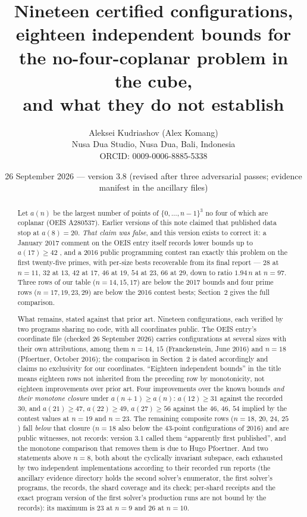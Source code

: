 \documentclass[11pt,a4paper]{article}
\title{Nineteen certified configurations, eighteen independent bounds for the no-four-coplanar problem in the cube,\\
and what they do not establish}
\author{Aleksei Kudriashov (Alex Komang)\\ \small Nusa Dua Studio, Nusa Dua, Bali, Indonesia\\ \small ORCID: 0009-0006-8885-5338}
\date{26 September 2026 --- version 3.8 (revised after three adversarial passes; evidence manifest in the ancillary files)}
\begin{document}
\maketitle
\begin{abstract}
Let $a(n)$ be the largest number of points of $\{0,\dots,n-1\}^3$ no four of which are coplanar
(OEIS A280537).  Earlier versions of this note claimed that published data stop at $a(8)=20$.
\emph{That claim was false}, and this version exists to correct it: a January 2017 comment on
the OEIS entry itself records lower bounds up to $a(17)\ge42$ \cite{OEISA280537}, and a 2016
public programming contest ran exactly this problem on the first twenty-five primes, with
per-size bests recoverable from its final report \cite{AZsPCs} --- $28$ at $n=11$, $32$ at $13$,
$42$ at $17$, $46$ at $19$, $54$ at $23$, $66$ at $29$, down to ratio $1.94\,n$ at $n=97$.
Three rows of our table ($n=14,15,17$) are below the 2017 bounds and four prime rows
($n=17,19,23,29$) are below the 2016 contest bests; Section~2 gives the full comparison.

What remains, stated against that prior art.  Nineteen configurations, each verified by two
programs sharing no code, with all coordinates public.  The OEIS entry's coordinate file (checked
26 September 2026) carries configurations at several sizes with their own attributions, among them
$n=14$, $15$ (Franckenstein, June 2016) and $n=18$ (Pfoertner, October 2016); the comparison in
Section~2 is dated accordingly and claims no exclusivity for our coordinates.  ``Eighteen independent bounds'' in the title means eighteen rows not inherited from
the preceding row by monotonicity, not eighteen improvements over prior art.  Four improvements over the known bounds \emph{and their monotone
closure} under $a(n+1)\ge a(n)$: $a(12)\ge31$ against the recorded $30$, and $a(21)\ge47$,
$a(22)\ge49$, $a(27)\ge56$ against the $46$, $46$, $54$ implied by the contest values at $n=19$
and $n=23$.  The remaining composite rows ($n=18$, $20$, $24$, $25$) fall \emph{below} that
closure ($n=18$ also below the $43$-point configurations of 2016) and are public witnesses, not records: version 3.1 called them ``apparently first
published'', and the monotone comparison that removes them is due to Hugo Pfoertner.  And two
statements above $n=8$, both about the cyclically invariant subspace, each exhausted by two
independent implementations according to their recorded run reports (the ancillary evidence
directory holds the second solver's enumerator, the first solver's programs, the records, the shard
coverage and its check; per-shard receipts and the exact program version of the first solver's
production runs are not bound by the records): its maximum is $23$ at $n=9$ and $26$ at $n=10$.


\end{abstract}
\end{document}
